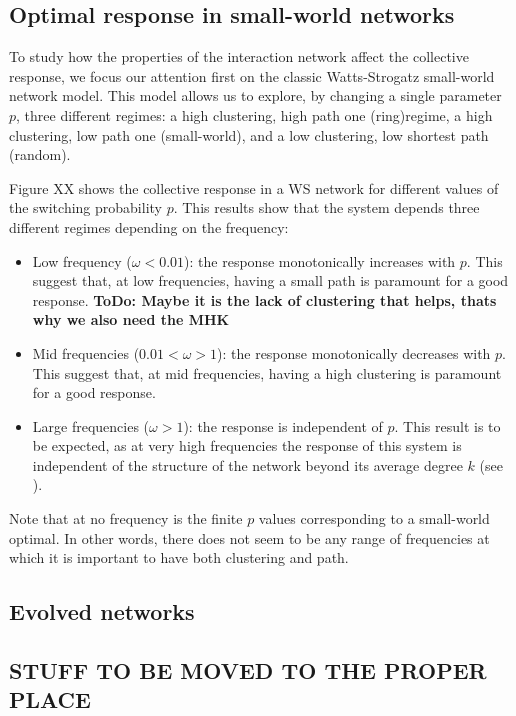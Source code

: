 \documentclass[fleqn,10pt]{wlscirep}
\newcommand{\TODO}[1]{{\bf {\color{red} ToDo:} #1}}
\begin{document}
\subsection{Optimal response in small-world networks}

To study how the properties of the interaction network affect the collective response, we focus our attention first on the classic Watts-Strogatz small-world network model.
This model allows us to explore, by changing a single parameter $p$, three different regimes: a high clustering, high path one (ring)regime, a high clustering, low path one (small-world), and a low clustering, low shortest path (random).

Figure XX shows the collective response in a WS network for different values of the switching probability $p$.
This results show that the system depends three different regimes depending on the frequency:
\begin{itemize}
    \item Low frequency ($\omega < 0.01$): the response monotonically increases with $p$.
    This suggest that, at low frequencies, having a small path is paramount for a good response. \TODO{Maybe it is the lack of clustering that helps, thats why we also need the MHK}
    \item Mid frequencies ($0.01 < \omega > 1$): the response monotonically decreases with $p$.
    This suggest that, at mid frequencies, having a high clustering is paramount for a good response.
    \item Large frequencies ($\omega > 1$): the response is independent of $p$.
    This result is to be expected, as at very high frequencies the response of this system is independent of the structure of the network beyond its average degree $k$ (see \cite{mateo15:_exces}).
\end{itemize}

Note that at no frequency is the finite $p$ values corresponding to a small-world optimal.
In other words, there does not seem to be any range of frequencies at which it is important to have both clustering and path.


\subsection{Evolved networks}


\subsection{STUFF TO BE MOVED TO THE PROPER PLACE}
\end{document}
